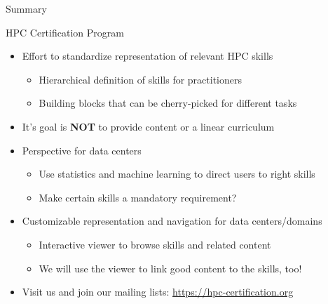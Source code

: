 \documentclass[compress,aspectratio=169]{beamer}
\begin{document}
\begin{frame}{Summary}

	\begin{block}{HPC Certification Program}
		\begin{itemize}
			\item Effort to standardize representation of relevant HPC skills
      \begin{itemize}
        \item Hierarchical definition of skills for practitioners
        \item Building blocks that can be cherry-picked for different tasks
      \end{itemize}
      \item It's goal is \textbf{NOT} to provide content or a linear curriculum
			\item Perspective for data centers
				\begin{itemize}
					\item Use statistics and machine learning to direct users to right skills
					\item Make certain skills a mandatory requirement?
				\end{itemize}
			\item Customizable representation and navigation for data centers/domains
      \begin{itemize}
        \item Interactive viewer to browse skills and related content
				\item We will use the viewer to link good content to the skills, too!
      \end{itemize}
      \item Visit us and join our mailing lists: \url{https://hpc-certification.org}
		\end{itemize}
	\end{block}
\end{frame}
\end{document}
